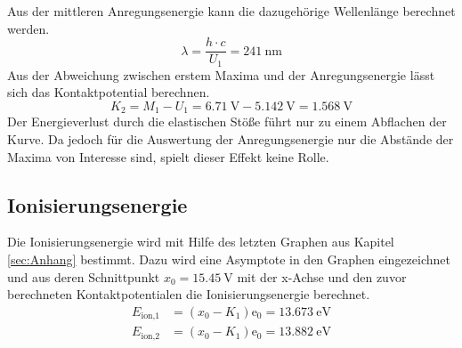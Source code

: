 Aus der mittleren Anregungsenergie kann die dazugehörige Wellenlänge berechnet werden.
\begin{equation*}
  \lambda = \frac{h \cdot c}{U_1} = \SI{241}{\nano\meter}
\end{equation*}
Aus der Abweichung zwischen erstem Maxima und der Anregungsenergie lässt sich das Kontaktpotential berechnen.
\begin{equation*}
  K_2 = M_1 - U_1 = \SI{6.71}{\volt} - \SI{5.142}{\volt} = \SI{1.568}{\volt}
\end{equation*}
Der Energieverlust durch die elastischen Stöße führt nur zu einem Abflachen der Kurve.
Da jedoch für die Auswertung der Anregungsenergie nur die Abstände der Maxima von Interesse sind, spielt dieser Effekt keine Rolle.

\subsection{Ionisierungsenergie}
\label{sec:A4}

Die Ionisierungsenergie wird mit Hilfe des letzten Graphen aus Kapitel \ref{sec:Anhang} bestimmt.
Dazu wird eine Asymptote in den Graphen eingezeichnet und aus deren Schnittpunkt $x_0 = \SI{15.45}{\volt}$ mit der x-Achse und den zuvor berechneten Kontaktpotentialen die Ionisierungsenergie berechnet.
\begin{align*}
E_\text{ion,1} &= (x_0 - K_1) \text{e}_0 = \SI{13.673}{\eV}  \\
E_\text{ion,2} &= (x_0 - K_1) \text{e}_0 = \SI{13.882}{\eV}  \\
\end{align*}
